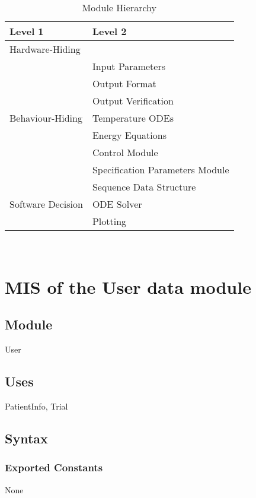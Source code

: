 \documentclass[12pt, titlepage]{article}
\begin{document}
\begin{table}[h!]
\centering
\begin{tabular}{p{} p{}}
\toprule
\textbf{Level 1} & \textbf{Level 2}\\
\midrule

{Hardware-Hiding} & ~ \\
\midrule

\multirow{7}{0.3\textwidth}{Behaviour-Hiding} & Input Parameters\\
& Output Format\\
& Output Verification\\
& Temperature ODEs\\
& Energy Equations\\ 
& Control Module\\
& Specification Parameters Module\\
\midrule

\multirow{3}{0.3\textwidth}{Software Decision} & {Sequence Data Structure}\\
& ODE Solver\\
& Plotting\\
\bottomrule

\end{tabular}
\caption{Module Hierarchy}
\label{TblMH}
\end{table}

\newpage
~\newpage



\section{MIS of the User data module} \label{User}

\subsection{Module}

User

\subsection{Uses}
PatientInfo, Trial

\subsection{Syntax}

\subsubsection{Exported Constants}
None
\end{document}

